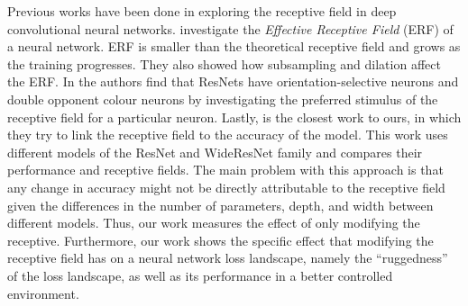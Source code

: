  Previous works have been done in exploring the receptive field in deep convolutional neural networks.
 \cite{luoUnderstandingEffectiveReceptive2016}  investigate the \textit{Effective Receptive Field} (ERF) of a neural network. ERF is smaller than the theoretical receptive field and grows as the training progresses. They also showed how subsampling and dilation affect the ERF. In \cite{kobayashiInterpretationResNetVisualization2020} the authors find that ResNets have orientation-selective neurons and double opponent colour neurons by investigating the
 preferred stimulus of the receptive field for a particular neuron. Lastly, \citep{kimDeadPixelTest2023} is the closest work
to ours, in which they try to link the receptive field to the accuracy of the model. This work uses different models of the ResNet and WideResNet family and compares their performance and receptive fields. The main problem with this approach is that any change in accuracy might not be directly attributable to the receptive field given the differences in the number of parameters, depth, and width between different models. Thus, our work measures the effect of only modifying the receptive. Furthermore, our work shows the specific effect that modifying the receptive field has on a neural network loss landscape, namely the ``ruggedness'' of the loss landscape, as well as its performance in a better controlled environment.



